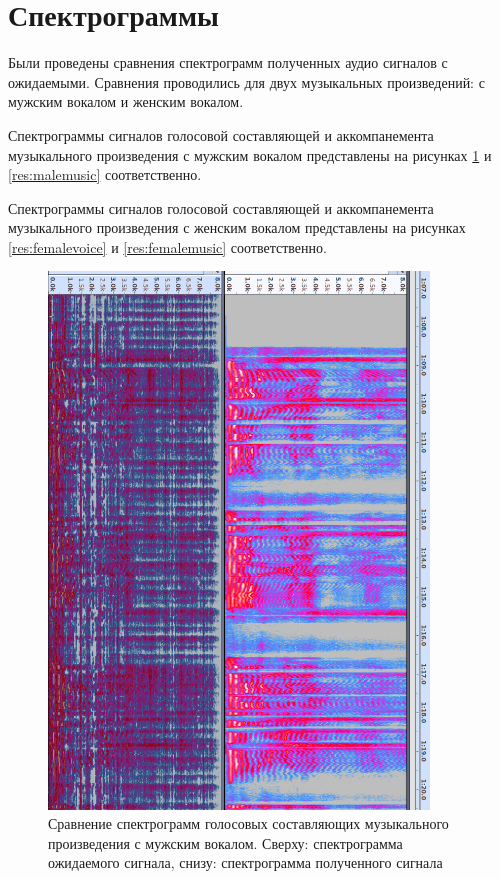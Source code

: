 \section{Спектрограммы}

Были проведены сравнения спектрограмм полученных аудио сигналов с ожидаемыми. Сравнения проводились для двух музыкальных произведений: с мужским вокалом и женским вокалом.

Спектрограммы сигналов голосовой составляющей и аккомпанемента музыкального произведения с мужским вокалом представлены на рисунках \ref{res:malevoice} и  \ref{res:malemusic} соответственно.

Спектрограммы сигналов голосовой составляющей и аккомпанемента музыкального произведения с женским вокалом представлены на рисунках \ref{res:femalevoice} и  \ref{res:femalemusic} соответственно.

\begin{figure}
	\centering
	\includegraphics[width=0.9\textwidth]{inc/img/spec-voice-male}
	\caption{Сравнение спектрограмм голосовых составляющих музыкального произведения с мужским вокалом. Сверху: спектрограмма ожидаемого сигнала, снизу: спектрограмма полученного сигнала}
	\label{res:malevoice}
\end{figure}

